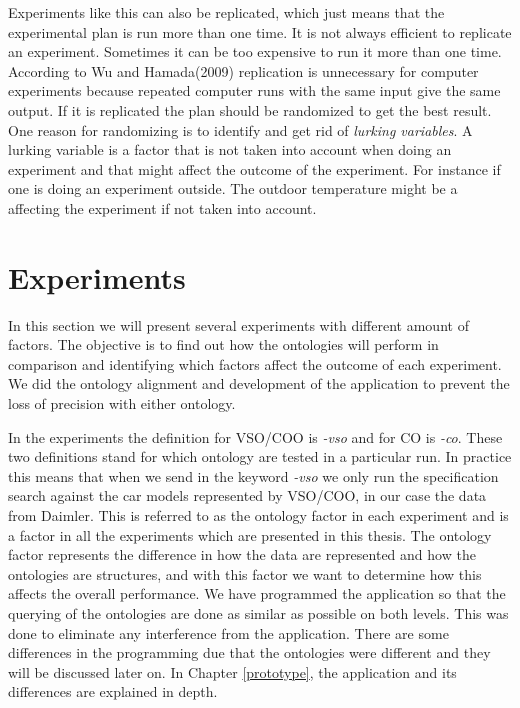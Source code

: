 \documentclass{llncs}
\begin{document}
Experiments like this can also be replicated, which just means that the experimental plan is run more than one time. 
It is not always efficient to replicate an experiment. Sometimes it can be too expensive to run it more than one time. 
According to Wu and Hamada(2009) replication is unnecessary for computer experiments because repeated computer runs 
with the same input give the same output.
If it is replicated the plan should be randomized to get the best result. One reason for randomizing is to 
identify and get rid of \textit{lurking variables}. A lurking variable is a factor that is not taken into 
account when doing an experiment and that might affect the outcome of the experiment. For instance 
if one is doing an experiment outside. The outdoor temperature might be a affecting the experiment if not taken 
into account.~\cite{FullFac}

\section{Experiments}
In this section we will present several experiments with different amount of factors.
The objective is to find out how the ontologies will perform in comparison and identifying 
which factors affect the outcome of each experiment. We did the ontology alignment and 
development of the application to prevent the loss of precision with either ontology. 

In the experiments the definition for VSO/COO is \textit{-vso} and for CO is \textit{-co}.
These two definitions stand for which ontology are tested in a particular run. In practice this means that when 
we send in the keyword \textit{-vso} we only run the specification search against the car models represented by VSO/COO, 
in our case the data from Daimler. This is referred to 
as the ontology factor in each experiment and is a factor in all the experiments which are presented in 
this thesis. The ontology factor represents the difference in how the data are represented and how the ontologies are 
structures, and with this factor we want to determine how this affects the overall performance. 
We have programmed the application so that the querying of the ontologies are done as similar as possible on both 
levels. This was done to eliminate any interference from the application. There are some 
differences in the programming due that the ontologies were different and they will be discussed later on. 
In Chapter \ref{prototype}, the application and its differences are explained in depth. 
\end{document}
